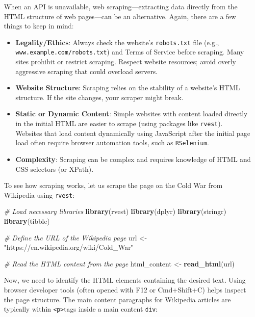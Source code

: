 \documentclass[
]{book}
\newenvironment{Shaded}{\begin{snugshade}}{\end{snugshade}}
\newcommand{\CommentTok}[1]{\textcolor[rgb]{0.56,0.35,0.01}{\textit{#1}}}
\newcommand{\FunctionTok}[1]{\textcolor[rgb]{0.13,0.29,0.53}{\textbf{#1}}}
\newcommand{\NormalTok}[1]{#1}
\newcommand{\OtherTok}[1]{\textcolor[rgb]{0.56,0.35,0.01}{#1}}
\newcommand{\StringTok}[1]{\textcolor[rgb]{0.31,0.60,0.02}{#1}}
\providecommand{\tightlist}{%
  \setlength{\itemsep}{0pt}\setlength{\parskip}{0pt}}
\begin{document}
When an API is unavailable, web scraping---extracting data directly from the HTML structure of web pages---can be an alternative. Again, there are a few things to keep in mind:

\begin{itemize}
\tightlist
\item
  \textbf{Legality/Ethics}: Always check the website's \texttt{robots.txt} file (e.g., \texttt{www.example.com/robots.txt}) and Terms of Service before scraping. Many sites prohibit or restrict scraping. Respect website resources; avoid overly aggressive scraping that could overload servers.
\item
  \textbf{Website Structure}: Scraping relies on the stability of a website's HTML structure. If the site changes, your scraper might break.
\item
  \textbf{Static or Dynamic Content}: Simple websites with content loaded directly in the initial HTML are easier to scrape (using packages like \texttt{rvest}). Websites that load content dynamically using JavaScript after the initial page load often require browser automation tools, such as \texttt{RSelenium}.
\item
  \textbf{Complexity}: Scraping can be complex and requires knowledge of HTML and CSS selectors (or XPath).
\end{itemize}

To see how scraping works, let us scrape the page on the Cold War from Wikipedia using \texttt{rvest}:

\begin{Shaded}
\begin{Highlighting}[]
\CommentTok{\# Load necessary libraries}
\FunctionTok{library}\NormalTok{(rvest)}
\FunctionTok{library}\NormalTok{(dplyr)}
\FunctionTok{library}\NormalTok{(stringr)}
\FunctionTok{library}\NormalTok{(tibble)}

\CommentTok{\# Define the URL of the Wikipedia page}
\NormalTok{url }\OtherTok{\textless{}{-}} \StringTok{"https://en.wikipedia.org/wiki/Cold\_War"}

\CommentTok{\# Read the HTML content from the page}
\NormalTok{html\_content }\OtherTok{\textless{}{-}} \FunctionTok{read\_html}\NormalTok{(url)}
\end{Highlighting}
\end{Shaded}

Now, we need to identify the HTML elements containing the desired text. Using browser developer tools (often opened with F12 or Cmd+Shift+C) helps inspect the page structure. The main content paragraphs for Wikipedia articles are typically within \texttt{\textless{}p\textgreater{}}tags inside a main content \texttt{div}:
\end{document}
